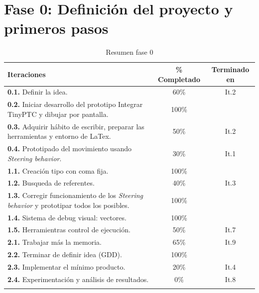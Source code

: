 \section{Fase 0: Definición del proyecto y primeros pasos}
\begin{longtable}[c]{|p{7cm}|c|c|}
\hline
Iteraciones                                               & \% Completado    & Terminado en \\
\hline
\endhead
\textbf{0.1.} Definir la idea.                              & 60\%          & It.2         \\
	\cmidrule[.006pt]{1-3}
\textbf{0.2.} Iniciar desarrollo del prototipo
				Integrar TinyPTC y dibujar por pantalla.    & 100\%         &              \\
	\cmidrule[.006pt]{1-3}
\textbf{0.3.} Adquirir hábito de escribir, preparar
				las herramientas y entorno de LaTex.        & 50\%          & It.2         \\
	\cmidrule[.006pt]{1-3}
\textbf{0.4.} Prototipado del movimiento usando 
				\textit{Steering behavior}.                 & 30\%          & It.1         \\

\cmidrule[1pt]{1-3}

\textbf{1.1.} Creación tipo con coma fija.                  & 100\%         &         \\
	\cmidrule[.006pt]{1-3}
\textbf{1.2.} Busqueda de referentes.                       & 40\%          & It.3    \\
	\cmidrule[.006pt]{1-3}
\textbf{1.3.} Corregir funcionamiento de los
				\textit{Steering behavior} y
				prototipar todos los posibles.              & 100\%         &          \\
	\cmidrule[.006pt]{1-3}
\textbf{1.4.} Sistema de debug visual: vectores.            & 100\%         &          \\ 
	\cmidrule[.006pt]{1-3}
\textbf{1.5.} Herramientras control de ejecución.           & 50\%          & It.7     \\ 

\cmidrule[1pt]{1-3}

\textbf{2.1.} Trabajar más la memoria.                      & 65\%          & It.9 \\
	\cmidrule[.006pt]{1-3}
\textbf{2.2.} Terminar de definir idea (GDD).               & 100\%         &          \\
	\cmidrule[.006pt]{1-3}
\textbf{2.3.} Implementar el mínimo producto.               & 20\%          & It.4     \\
	\cmidrule[.006pt]{1-3}
\textbf{2.4.} Experimentación y análisis de resultados.     & 0\%           & It.8     \\
\hline
\caption{Resumen fase 0}
\end{longtable}

